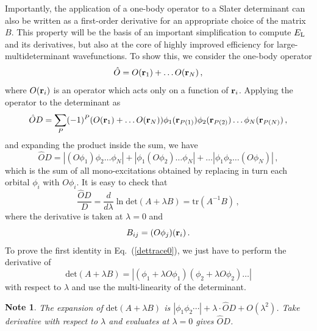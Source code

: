 \documentclass[aip,jcp,reprint,floatfix,onecolumn]{revtex4-1}
\newtheorem*{note}{Note}
\def\det{\text{det}}
\def\tr{\text{tr}}
\def\A{A}
\def\wdet{D}
\begin{document}
Importantly, the application of a one-body operator to a Slater determinant
can also be written as a first-order derivative for an appropriate choice of
the matrix $B$.
This property will be the basis of an important simplification  to compute  $E_{\rm L}$ and its derivatives, but also at the core of highly improved efficiency for large-multideterminant wavefunctions.
To show this, we consider the one-body operator
\begin{equation}
\hat{O} = O({\bf r}_1) + \dots O({\bf r}_N)\,,
\end{equation}
where $O({\bf r}_i)$ is an operator which acts only on a function of ${\bf r}_i$.
Applying the operator to the determinant as
\begin{equation}
\hat{O} \wdet =  \sum_P  (-1)^P  (O({\bf r}_1) + \dots O({\bf r}_N))
\phi_{1}({\bf r}_{P(1)})  \phi_{2}({\bf r}_{P(2)}) \dots \phi_N ({\bf r}_{P(N)})  \,,
\end{equation}
and expanding the product inside the sum, we have
\begin{equation}
\hat{O} \wdet = |(O \phi_1)  \phi_2 \dots \phi_N| + |\phi_1  (O\phi_2) \dots \phi_N| + \dots   |\phi_1  \phi_2 \dots (O \phi_N) |\,,
\label{omono}
\end{equation}
which is the sum of all mono-excitations obtained by replacing in turn each orbital $\phi_i$ with $O \phi_i$.
It is easy to check that
\begin{equation}
\frac{\hat{O}\wdet}{\wdet} = \frac{d}{d\lambda} \ln  \det (\A + \lambda B) =  \tr (\A^{-1}  B) \,,
\label{dettrace0}
\end{equation}
where the derivative is taken at $\lambda=0$ and
\begin{equation}
B_{ij} = (O\phi_j)({\bf r}_i) \,.
\end{equation}
To prove the first identity in  Eq.~(\ref{dettrace0}), we just have to perform the derivative of
\begin{equation}
\det(A+\lambda B) = |(\phi_1 + \lambda O \phi_1) (\phi_2 + \lambda O \phi_2) \dots |
\end{equation}
with respect to $\lambda$ and use the multi-linearity of the determinant.

\begin{note}
The expansion of $\det (A+\lambda B)$ is $|\phi_1\phi_2\cdots| + \lambda \cdot \hat{O}D + O(\lambda^2)$.
Take derivative with respect to $\lambda$ and evaluates at $\lambda=0$ gives $\hat{O}D$.
\end{note}
\end{document}
